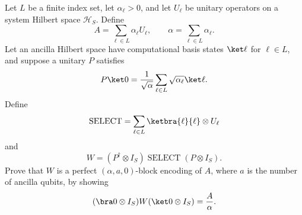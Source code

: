 Let $L$ be a finite index set, let $\alpha_\ell>0$, and let $U_\ell$ be unitary operators on a system Hilbert space $\mathcal H_S$.  Define
$$
    A=\sum_{\ell\in L}\alpha_\ell U_\ell,
    \qquad
    \alpha=\sum_{\ell\in L}\alpha_\ell.
$$
Let an ancilla Hilbert space have computational basis states $\ket\ell$ for $\ell\in L$, and suppose a unitary $P$ satisfies
$$
    P\ket0=\frac1{\sqrt\alpha}\sum_{\ell\in L}\sqrt{\alpha_\ell}\ket\ell.
$$
Define
$$
    \operatorname{SELECT}
    =
    \sum_{\ell\in L}\ketbra{\ell}{\ell}\otimes U_\ell
$$
and
$$
    W=(P^\dagger\otimes I_S)\operatorname{SELECT}(P\otimes I_S).
$$
Prove that $W$ is a perfect $(\alpha,a,0)$-block encoding of $A$, where $a$ is the number of ancilla qubits, by showing
$$
    (\bra0\otimes I_S)W(\ket0\otimes I_S)=\frac{A}{\alpha}.
$$
